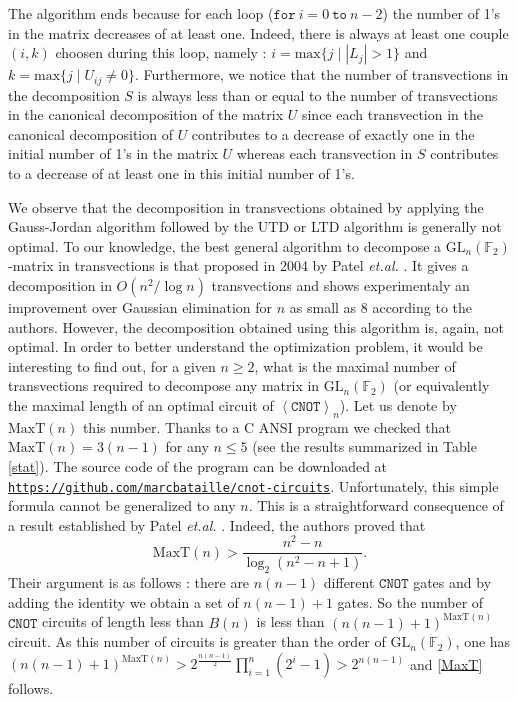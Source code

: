 \documentclass[a4paper,12pt,fleqn]{article}
\newcommand\cnot{\mathtt{CNOT}}
\newcommand\XG[1][n]{\left<\cnot\right>_{#1}}
\newcommand\GL[1][n]{\mathrm{GL}_{#1}(\mathbb{F}_2)}
\renewcommand\geq{\geqslant}
\renewcommand\leq{\leqslant}
\begin{document}
    The algorithm ends because for each loop ($\mathtt{for}\  i=0\  \mathtt{to}\ n-2$) the number of 1's in the matrix decreases of at least one. Indeed, there is always at least one couple $(i,k)$ choosen during this loop, namely : $i=\mathrm{max}\{j\mid |L_j|>1\}$ and $k=\mathrm{max}\{j\mid U_{ij}\neq 0\}$.
    Furthermore, we notice that the number of transvections in the decomposition $S$ is always less than or equal to the number of transvections in the canonical decomposition of the matrix $U$ since each transvection in the canonical decomposition of $U$ contributes to a decrease of exactly one in the initial number of 1's in the matrix $U$ whereas each transvection in $S$ contributes to a decrease of at least one in this initial number of 1's.\medskip

    We observe that the decomposition in transvections obtained by applying the Gauss-Jordan algorithm followed by the UTD or LTD algorithm is generally not optimal.
To our knowledge, the best general algorithm to decompose a $\GL$-matrix in transvections is that proposed in  2004 by Patel \textit{et.al.} \cite{2004PMH}. It gives a decomposition in $O(n^2/\log n)$ transvections and shows experimentaly an improvement over Gaussian
elimination for $n$ as small as 8 according to the authors. However, the decomposition obtained using this algorithm is, again, not optimal.
     In order to better understand the optimization problem, it would be interesting to find out, for a given $n\geq 2$, what is the maximal number of transvections  required to decompose any matrix in $\GL$ (or equivalently the maximal length of an optimal circuit of $\XG$). Let us denote by $\mathrm{MaxT}(n)$ this number.
Thanks to a C ANSI program we checked that $\mathrm{MaxT}(n)=3(n-1)$ for any $n\leq 5$ (see the results summarized in Table \ref{stat}). The source code of the program can be downloaded at \href{https://github.com/marcbataille/cnot-circuits/blob/master/optimization/cnot_conj.c}{\texttt{https://github.com/marcbataille/cnot-circuits}}.
Unfortunately, this simple formula cannot be generalized to any $n$. This is a straightforward consequence of a result established by Patel \textit{et.al.} \cite[lemma 1]{2004PMH}. Indeed, the authors proved that
\begin{equation}\label{MaxT}
  \mathrm{MaxT}(n)>\dfrac{n^2-n}{\log_2(n^2-n+1)}.
\end{equation}
Their argument is as follows : there are $n(n-1)$ different $\cnot$ gates and by adding the identity we obtain a set of $n(n-1)+1$ gates. So the number of $\cnot$ circuits of length less than $B(n)$ is less than $(n(n-1)+1)^{\mathrm{MaxT}(n)}$ circuit. As this number of circuits is greater than the order of $\GL$, one has
$(n(n-1)+1)^{\mathrm{MaxT}(n)}>2^{\frac{n(n-1)}{2}}\prod_{i=1}^n(2^i-1)>2^{n(n-1)}$ and \ref{MaxT} follows.
\end{document}
